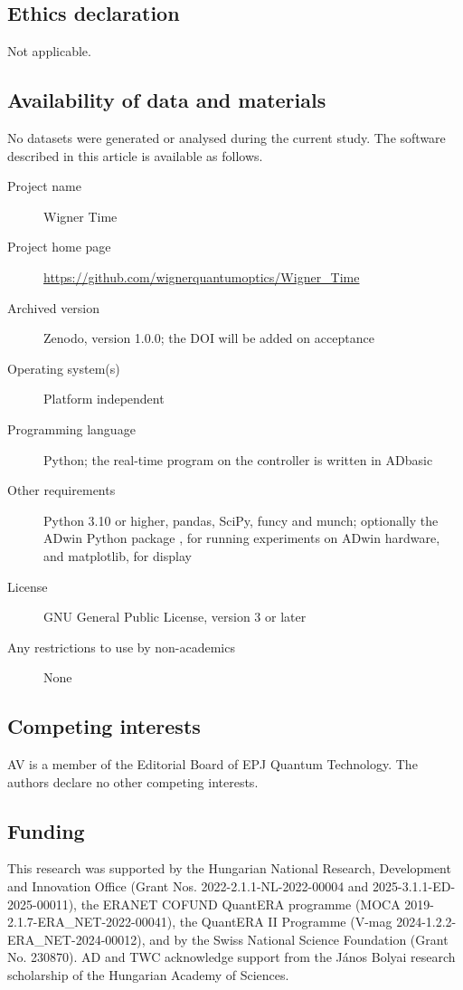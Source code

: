 \documentclass{SciPost}
\begin{document}
\subsection*{Ethics declaration}
Not applicable.

\subsection*{Availability of data and materials}
No datasets were generated or analysed during the current study. The software described in this article is available as follows.
\begin{description}
\item[Project name] Wigner Time
\item[Project home page] \url{https://github.com/wignerquantumoptics/Wigner_Time}
\item[Archived version] Zenodo, version 1.0.0; the DOI will be added on acceptance
\item[Operating system(s)] Platform independent
\item[Programming language] Python; the real-time program on the controller is written in ADbasic
\item[Other requirements] Python 3.10 or higher, pandas, SciPy, funcy and munch; optionally the ADwin Python package \cite{adwin_pypi}, for running experiments on ADwin hardware, and matplotlib, for display
\item[License] GNU General Public License, version 3 or later
\item[Any restrictions to use by non-academics] None
\end{description}

\subsection*{Competing interests}
AV is a member of the Editorial Board of EPJ Quantum Technology. The authors declare no other competing interests.

\subsection*{Funding}
This research was supported by the Hungarian National Research, Development and Innovation Office (Grant Nos. 2022-2.1.1-NL-2022-00004 and 2025-3.1.1-ED-2025-00011), the ERANET COFUND QuantERA programme (MOCA 2019-2.1.7-ERA\_NET-2022-00041), the QuantERA II Programme (V-mag 2024-1.2.2-ERA\_NET-2024-00012), and by the Swiss National Science Foundation (Grant No. 230870). AD and TWC acknowledge support from the János Bolyai research scholarship of the Hungarian Academy of Sciences.
\end{document}
